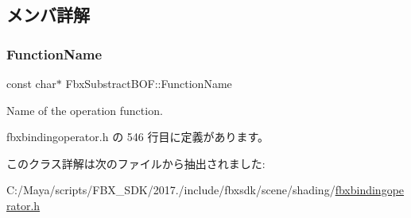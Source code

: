 \subsection{メンバ詳解}
\mbox{\label{class_fbx_substract_b_o_f_a9fc179455ff9204e58db8670b51c44b2}} 
\subsubsection{\texorpdfstring{Function\+Name}{FunctionName}}
{\footnotesize\ttfamily const char$\ast$ Fbx\+Substract\+B\+O\+F\+::\+Function\+Name\hspace{0.3cm}{\ttfamily [static]}}



Name of the operation function. 



 fbxbindingoperator.\+h の 546 行目に定義があります。



このクラス詳解は次のファイルから抽出されました\+:\begin{DoxyCompactItemize}
\item 
C\+:/\+Maya/scripts/\+F\+B\+X\+\_\+\+S\+D\+K/2017./include/fbxsdk/scene/shading/\hyperlink{fbxbindingoperator_8h}{fbxbindingoperator.\+h}\end{DoxyCompactItemize}

